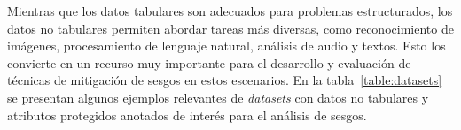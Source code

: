     Mientras que los datos tabulares son adecuados para problemas estructurados, los datos no tabulares permiten abordar tareas m\'as diversas, 
    como reconocimiento de im\'agenes, procesamiento de lenguaje natural, an\'alisis de audio y textos. Esto los convierte en un recurso muy importante
    para el desarrollo y evaluaci\'on de t\'ecnicas de mitigaci\'on de sesgos en estos escenarios. En la tabla~\ref{table:datasets} 
    se presentan algunos ejemplos relevantes de \emph{datasets} con datos no tabulares y atributos protegidos anotados de inter\'es para el 
    an\'alisis de sesgos.


